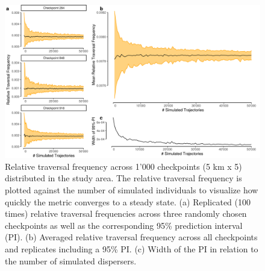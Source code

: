 \documentclass[abstract=on,10pt,a4paper,bibliography=totocnumbered]{article}
\begin{document}
\begin{figure}
  \begin{center}
    \includegraphics[width=\textwidth]{99_Convergence}
    \caption{Relative traversal frequency across 1'000 checkpoints (5 km x 5)
    distributed in the study area. The relative traversal frequency is plotted
    against the number of simulated individuals to visualize how quickly the
    metric converges to a steady state. (a) Replicated (100 times) relative
    traversal frequencies across three randomly chosen checkpoints as well as
    the corresponding 95\% prediction interval (PI). (b) Averaged relative
    traversal frequency across all checkpoints and replicates including a 95\%
    PI. (c) Width of the PI in relation to the number of simulated dispersers.}
    \label{Convergence}
  \end{center}
\end{figure}

\end{document}
